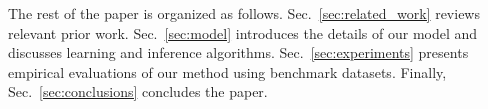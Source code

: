 The rest of the paper is organized as follows.
Sec.~\ref{sec:related_work} reviews relevant prior work.
Sec.~\ref{sec:model} introduces the details of our model and discusses learning
and inference algorithms.
Sec.~\ref{sec:experiments} presents empirical evaluations of
our method using benchmark datasets.
Finally, Sec.~\ref{sec:conclusions} concludes the paper.








